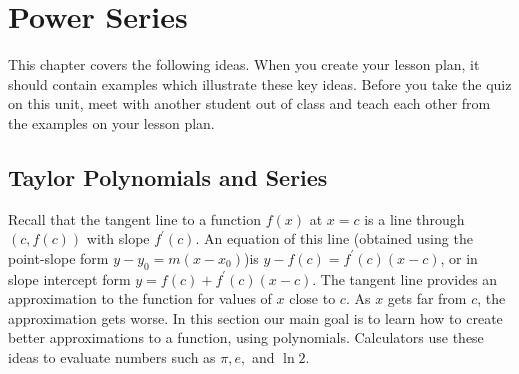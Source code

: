 
\chapter{Power Series}

This chapter covers the following ideas. When you create your lesson plan, it should contain examples which illustrate these key ideas. Before you take the quiz on this unit, meet with another student out of class and teach each other from the examples on your lesson plan. 




\section{Taylor Polynomials and Series} 

Recall that the tangent line to a function $f(x)$ at $x=c$ is a line through $(c,f(c))$ with slope $f^\prime(c)$.  An equation of this line (obtained using the point-slope form $y-y_0 = m(x-x_0)$)is $y-f(c)= f^\prime(c)(x-c)$, or in slope intercept form $y=f(c)+f^\prime(c)(x-c)$.  The tangent line provides an approximation to the function for values of $x$ close to $c$. As $x$ gets far from $c$, the approximation gets worse. In this section our main goal is to learn how to create better approximations to a function, using polynomials. Calculators use these ideas to evaluate numbers such as $\pi, e,$ and $\ln 2$.


